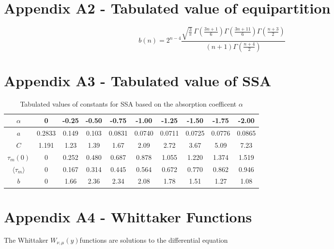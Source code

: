 \begin{table}[H]
\begin{tabular}{@{}ccccccccc@{}}
     
    \end{tabular}
\end{table}
\section{Appendix A2 - Tabulated value of equipartition}
\begin{equation}
    b(n) = 2^{n-4} \frac{\sqrt{\frac{3}{\pi}} \, \Gamma\left(\frac{3n + 1}{6}\right) \Gamma\left(\frac{3n + 11}{6}\right) \Gamma\left(\frac{n + 3}{2}\right)}{(n + 1) \Gamma\left(\frac{n + 4}{2}\right)}
\end{equation}

\section{Appendix A3 - Tabulated value of SSA}

\begin{table}[H]
    \centering
    \caption{Tabulated values of constants for SSA based on the absorption coefficent $\alpha$}
    \label{tab:constants}
    \begin{tabular}{|c|c|c|c|c|c|c|c|c|c|}
        \hline
        $\alpha$ & 0 & -0.25 & -0.50 & -0.75 & -1.00 & -1.25 & -1.50 & -1.75 & -2.00 \\
        \hline
        $a$ &  0.2833 & 0.149 & 0.103 & 0.0831 & 0.0740 & 0.0711 & 0.0725 & 0.0776 & 0.0865 \\
        \hline
        $C$ &  1.191 & 1.23 & 1.39 & 1.67 & 2.09 & 2.72 & 3.67 & 5.09 & 7.23 \\
        \hline
        $\tau_m(0)$ &  0 & 0.252 & 0.480 & 0.687 & 0.878 & 1.055 & 1.220 & 1.374 & 1.519 \\
        \hline
        $\langle \tau_m \rangle$ & 0 & 0.167 & 0.314 & 0.445 & 0.564 & 0.672 & 0.770 & 0.862 & 0.946 \\
        \hline
        $b$ & 0 & 1.66 & 2.36 & 2.34 & 2.08 & 1.78 & 1.51 & 1.27 & 1.08 \\
        \hline
    \end{tabular}
\end{table}


\section{Appendix A4 - Whittaker Functions}

The Whittaker $W_{\nu,\mu}(y)$functions are solutions to the differential equation  

